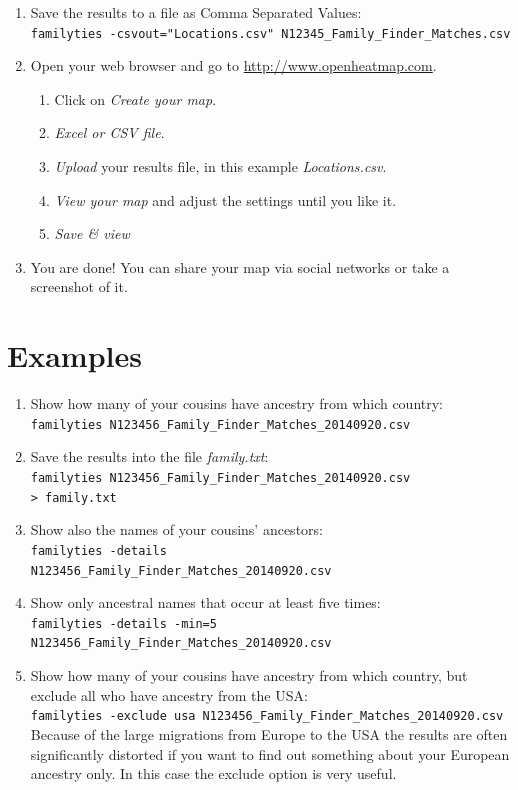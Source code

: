 \documentclass[12pt,a4paper]{article}
\begin{document}
\begin{enumerate}
\item Save the results to a file as Comma Separated Values:\\
  \texttt{familyties -csvout="Locations.csv"  N12345\_Family\_Finder\_Matches.csv}
\item Open your web browser and go to
      \href{http://www.openheatmap.com/}{http://www.openheatmap.com}.
	\begin{enumerate}
	\item Click on \emph{Create your map}.
	\item \emph{Excel or CSV file}.
	\item \emph{Upload} your results file,
            in this example \emph{Locations.csv}.
	\item \emph{View your map} and adjust the settings until you like it.
	\item \emph{Save \& view}
	\end{enumerate}
\item You are done! You can share your map via social networks
  or take a screenshot of it.
\end{enumerate}


\section{Examples}

\begin{enumerate}
\item Show how many of your cousins have ancestry from which
   country:\\
   \texttt{familyties N123456\_Family\_Finder\_Matches\_20140920.csv}
\item Save the results into the file \emph{family.txt}:\\
   \texttt{familyties N123456\_Family\_Finder\_Matches\_20140920.csv\\ > family.txt}
\item Show also the names of your cousins' ancestors:\\
   \texttt{familyties -details\\ N123456\_Family\_Finder\_Matches\_20140920.csv}
\item Show only ancestral names that occur at least five times:\\
   \texttt{familyties -details -min=5\\ N123456\_Family\_Finder\_Matches\_20140920.csv}
\item Show how many of your cousins have ancestry from which
   country, but exclude all who have ancestry from the USA:\\
   \texttt{familyties -exclude usa N123456\_Family\_Finder\_Matches\_20140920.csv}\\
   Because of the large migrations from Europe to the USA the results
   are often significantly distorted if you want to find out something
   about your European ancestry only. In this case the exclude option
   is very useful.
\end{enumerate}
\end{document}
